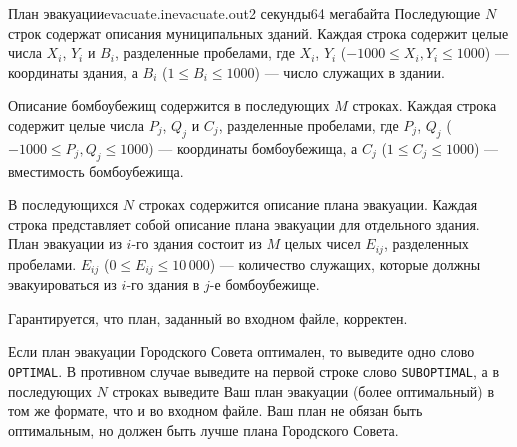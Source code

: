 \begin{problem}{План эвакуации}{evacuate.in}{evacuate.out}{2 секунды}{64 мегабайта}
Последующие $N$ строк содержат описания муниципальных зданий. Каждая строка содержит целые числа $X_i$, $Y_i$
и $B_i$, разделенные пробелами, где $X_i$, $Y_i$ ($-1000 \le X_i, Y_i \le 1000$) --- координаты здания, а 
$B_i$ ($1 \le B_i \le 1000$) --- число служащих в здании.

Описание бомбоубежищ содержится в последующих $M$ строках. Каждая строка содержит целые числа $P_j$, $Q_j$
и $C_j$, разделенные пробелами, где $P_j$, $Q_j$ ($-1000 \le P_j, Q_j \le 1000$) --- координаты бомбоубежища, а 
$C_j$ ($1 \le C_j \le 1000$) --- вместимость бомбоубежища.

В последующихся $N$ строках содержится описание плана эвакуации. Каждая строка представляет собой описание
плана эвакуации для отдельного здания. План эвакуации из $i$-го здания состоит из $M$ целых чисел $E_{ij}$,
разделенных пробелами. $E_{ij}$ ($0 \le E_{ij} \le 10\,000$) --- количество служащих, которые должны эвакуироваться 
из $i$-го здания в $j$-е бомбоубежище.

Гарантируется, что план, заданный во входном файле, корректен.
 
\OutputFile

Если план эвакуации Городского Совета оптимален, то выведите одно слово \texttt{OPTIMAL}.
В противном случае выведите на первой строке слово \texttt{SUBOPTIMAL}, а в последующих $N$
строках выведите Ваш план эвакуации (более оптимальный) в том же формате, что и во входном файле.
Ваш план не обязан быть оптимальным, но должен быть лучше плана Городского Совета.


\Example
\parindent=0mm
\begin{example}
%
%
\end{example}

\end{problem}
